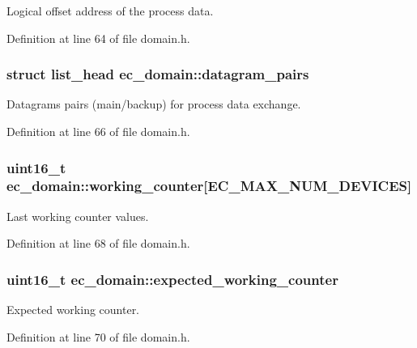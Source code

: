 \-Logical offset address of the process data. 



\-Definition at line 64 of file domain.\-h.

\subsubsection[{datagram\-\_\-pairs}]{\setlength{\rightskip}{0pt plus 5cm}struct list\-\_\-head {\bf ec\-\_\-domain\-::datagram\-\_\-pairs}}\label{structec__domain_a9935943271eabfa9d5c68b5c19fe3bee}


\-Datagrams pairs (main/backup) for process data exchange. 



\-Definition at line 66 of file domain.\-h.

\subsubsection[{working\-\_\-counter}]{\setlength{\rightskip}{0pt plus 5cm}uint16\-\_\-t {\bf ec\-\_\-domain\-::working\-\_\-counter}[\-E\-C\-\_\-\-M\-A\-X\-\_\-\-N\-U\-M\-\_\-\-D\-E\-V\-I\-C\-E\-S]}\label{structec__domain_a6f18a1d8c6b2a83acf3e5932a5f3048f}


\-Last working counter values. 



\-Definition at line 68 of file domain.\-h.

\subsubsection[{expected\-\_\-working\-\_\-counter}]{\setlength{\rightskip}{0pt plus 5cm}uint16\-\_\-t {\bf ec\-\_\-domain\-::expected\-\_\-working\-\_\-counter}}\label{structec__domain_af978a94741ca2483ce0460e34c77271d}


\-Expected working counter. 



\-Definition at line 70 of file domain.\-h.


